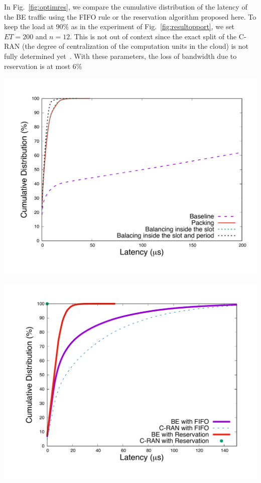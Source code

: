 \documentclass[]{llncs}
\begin{document}
In Fig.~\ref{fig:optimres}, we compare the cumulative distribution of the latency of the BE traffic using the FIFO rule or the reservation algorithm proposed here. To keep the load at $90\%$ as in the experiment of Fig.~\ref{fig:resultopport}, we set $ET = 200$ and $n = 12$. This is not out of context since the exact split of the C-RAN (the degree of centralization of the computation units in the cloud) is not fully determined yet~\cite{mobile2011c}. With these parameters, the loss of bandwidth due to reservation is at most $6\%$
 

  \begin{minipage}[b]{0.45\linewidth}
\centering
      \includegraphics[scale=0.25]{repart1res}
        \label{fig:algocmp}
  \end{minipage} 
  \hfill
  \begin{minipage}[b]{0.45\linewidth}
\centering
      \includegraphics[scale=0.25]{optim.pdf}
        \label{fig:optimres}
  \end{minipage} 
\end{document}
